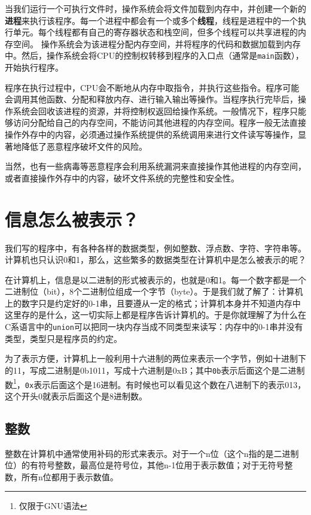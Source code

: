当我们运行一个可执行文件时，操作系统会将文件加载到内存中，并创建一个新的\textbf{进程}来执行该程序。每一个进程中都会有一个或多个\textbf{线程}，线程是进程中的一个执行单元。每个线程都有自己的寄存器状态和栈空间，但多个线程可以共享进程的内存空间。
操作系统会为该进程分配内存空间，并将程序的代码和数据加载到内存中。然后，操作系统会将CPU的控制权转移到程序的入口点（通常是\texttt{main}函数），开始执行程序。

程序在执行过程中，CPU会不断地从内存中取指令，并执行这些指令。程序可能会调用其他函数、分配和释放内存、进行输入输出等操作。当程序执行完毕后，操作系统会回收该进程的资源，并将控制权返回给操作系统。一般情况下，程序只能够访问分配给自己的内存空间，不能访问其他进程的内存空间。程序一般无法直接操作外存中的内容，必须通过操作系统提供的系统调用来进行文件读写等操作，显著地降低了恶意程序破坏文件的风险。

当然，也有一些病毒等恶意程序会利用系统漏洞来直接操作其他进程的内存空间，或者直接操作外存中的内容，破坏文件系统的完整性和安全性。

\section{信息怎么被表示？}

我们写的程序中，有各种各样的数据类型，例如整数、浮点数、字符、字符串等。计算机也只认识0和1，那么，这些繁多的数据类型在计算机中是怎么被表示的呢？

在计算机上，信息是以二进制的形式被表示的，也就是0和1。每一个数字都是一个二进制位（bit），8个二进制位组成一个字节（byte）。于是我们就了解了：计算机上的数字只是约定好的0-1串，且要遵从一定的格式；计算机本身并不知道内存中这里存的是什么，这一切实际上都是程序告诉计算机的。于是你就理解了为什么在C系语言中的\texttt{union}可以把同一块内存当成不同类型来读写：内存中的0-1串并没有类型，类型只是程序员的约定。

为了表示方便，计算机上一般利用十六进制的两位来表示一个字节，例如十进制下的11，写成二进制是0b1011，写成十六进制是0xB；其中\texttt{0b}表示后面这个是二进制数\footnote{仅限于GNU语法}，\texttt{0x}表示后面这个是16进制。有时候也可以看见这个数在八进制下的表示013，这个开头0就表示后面这个是8进制数。

\subsection{整数}
整数在计算机中通常使用补码的形式来表示。对于一个n位（这个n指的是二进制位）的有符号整数，最高位是符号位，其他n-1位用于表示数值；对于无符号整数，所有n位都用于表示数值。

